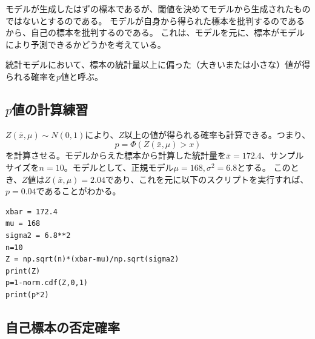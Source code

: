 モデルが生成したはずの標本であるが、閾値を決めてモデルから生成されたものではないとするのである。
モデルが自身から得られた標本を批判するのであるから、自己の標本を批判するのである。
これは、モデルを元に、標本がモデルにより予測できるかどうかを考えている。


\begin{defi}
    統計モデルにおいて、標本の統計量以上に偏った（大きいまたは小さな）値が得られる確率を$p$値と呼ぶ。
\end{defi}


\subsection{$p$値の計算練習}
$Z(\bar{x},\mu)\sim N(0,1)$により、$Z$以上の値が得られる確率も計算できる。つまり、
\begin{equation*}
    p = \varPhi(Z(\bar{x},\mu)>x)
\end{equation*}
を計算させる。モデルからえた標本から計算した統計量を$\bar{x}=172.4$、サンプルサイズを$n=10$。モデルとして、正規モデル$\mu=168,\sigma^2=6.8$とする。
このとき、$Z$値は$Z(\bar{x},\mu)=2.04$であり、これを元に以下のスクリプトを実行すれば、$p=0.04$であることがわかる。

\begin{lstlisting}
xbar = 172.4
mu = 168
sigma2 = 6.8**2
n=10
Z = np.sqrt(n)*(xbar-mu)/np.sqrt(sigma2)
print(Z)
p=1-norm.cdf(Z,0,1)
print(p*2)
\end{lstlisting}



\subsection{自己標本の否定確率}

